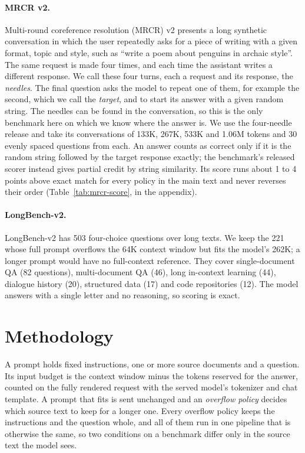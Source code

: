 \documentclass[letterpaper]{article} %
\begin{document}
\paragraph{MRCR v2.} Multi-round coreference resolution (MRCR) v2 \cite{vodrahalli2024michelangelo} presents a long synthetic conversation in which the user repeatedly asks for a piece of writing with a given format, topic and style, such as ``write a poem about penguins in archaic style''. The same request is made four times, and each time the assistant writes a different response. We call these four turns, each a request and its response, the \emph{needles}. The final question asks the model to repeat one of them, for example the second, which we call the \emph{target}, and to start its answer with a given random string. The needles can be found in the conversation, so this is the only benchmark here on which we know where the answer is. We use the four-needle release and take its conversations of 133K, 267K, 533K and 1.06M tokens and 30 evenly spaced questions from each. An answer counts as correct only if it is the random string followed by the target response exactly; the benchmark's released scorer instead gives partial credit by string similarity. Its score runs about 1 to 4 points above exact match for every policy in the main text and never reverses their order (Table~\ref{tab:mrcr-score}, in the appendix).

\paragraph{LongBench-v2.} LongBench-v2 \cite{bai2025longbenchv2} has 503 four-choice questions over long texts. We keep the 221 whose full prompt overflows the 64K context window but fits the model's 262K; a longer prompt would have no full-context reference. They cover single-document QA (82 questions), multi-document QA (46), long in-context learning (44), dialogue history (20), structured data (17) and code repositories (12). The model answers with a single letter and no reasoning, so scoring is exact.

\section{Methodology}
A prompt holds fixed instructions, one or more source documents and a question. Its input budget is the context window minus the tokens reserved for the answer, counted on the fully rendered request with the served model's tokenizer and chat template. A prompt that fits is sent unchanged and an \emph{overflow policy} decides which source text to keep for a longer one. Every overflow policy keeps the instructions and the question whole, and all of them run in one pipeline that is otherwise the same, so two conditions on a benchmark differ only in the source text the model sees.
\end{document}
